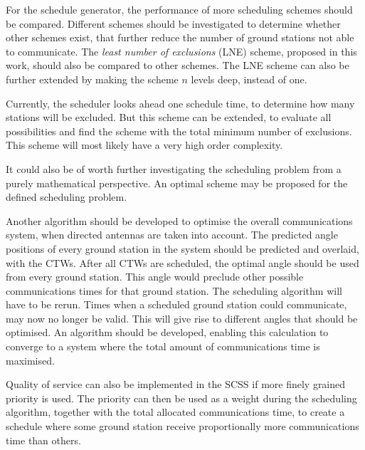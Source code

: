 For the schedule generator, the performance of more scheduling schemes should be compared.
Different schemes should be investigated to determine whether other schemes exist, that further
reduce the number of ground stations not able to communicate. The \emph{least number of exclusions} (LNE)
scheme, proposed in this work, should also be compared to other schemes. The LNE scheme can
also be further extended by making the scheme $n$ levels deep, instead of one.

Currently, the scheduler looks ahead one schedule time, to determine how many stations will
be excluded. But this scheme can be extended, to evaluate all possibilities and find the scheme
with the total minimum number of exclusions. This scheme will most likely have a very high order
complexity.

It could also be of worth further investigating the scheduling problem from a purely mathematical
perspective. An optimal scheme may be proposed for the defined scheduling problem.

Another algorithm should be developed to optimise the overall communications system, when
directed antennas are taken into account. The predicted angle positions of every ground station
in the system should be predicted and overlaid, with the CTWs. After all CTWs are scheduled,
the optimal angle should be used from every ground station. This angle would preclude other
possible communications times for that ground station. The scheduling algorithm will have to
be rerun. Times when a scheduled ground station could communicate, may now no longer be
valid. This will give rise to different angles that should be optimised. An algorithm should be
developed, enabling this calculation to converge to a system where the total amount of
communications time is maximised.

Quality of service can also be implemented in the SCSS if more finely grained
priority is used. The priority can then be used as a weight during the scheduling algorithm,
together with the total allocated communications time, to create a schedule where some ground
station receive proportionally more communications time than others.




